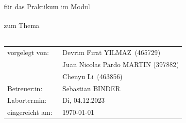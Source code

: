 %
%
%
%
%
\begin{titlepage}
\thispagestyle{scrheadings}
%
\setlength{\headheight}{103.0pt}

\chead[]{}
\ifoot[]{}
\cfoot[]{}
\ofoot[]{}
%
\noindent
\uni\\
\faculty\\
\institute\\
\department\\
%
\vspace{0.5cm}
\begin{center}
  \Large{\textbf{\textsc{\eventtype} \eventnumber}}\\[3.6ex]
  \Large{für das Praktikum im Modul}\\
  \Large{\textbf{\course}}\\[1.2ex]
  \Large{zum Thema}\\
  \Large{\textbf{\eventtopic}}\\[6.0ex]
  \normalsize
  \begin{tabular}{w{5.4cm}p{12cm}}%
    vorgelegt von:  & \quad \ Devrim Fırat YILMAZ\ (465729)\\[1.2ex]
                    & \quad \ Juan Nicolas Pardo MARTIN (397882)\\[1.2ex]
                    & \quad \ Chenyu Li\ (463856)\\[1.2ex] 

    Betreuer:in:    & \quad \ Sebastian BINDER\\[1.2ex] 
    Labortermin:    & \quad \ Di, 04.12.2023 \\[1.2ex]
    eingereicht am: & \quad \ \today
  \end{tabular}
\end{center}
%
\end{titlepage}
%
%
%